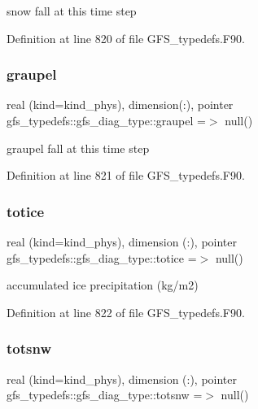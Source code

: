 snow fall at this time step 



Definition at line 820 of file G\+F\+S\+\_\+typedefs.\+F90.

\mbox{\label{structgfs__typedefs_1_1gfs__diag__type_a4667967acfa91574ee93d8a97dffd6ed}} 
\subsubsection{graupel}
{\footnotesize\ttfamily real (kind=kind\+\_\+phys), dimension(\+:), pointer gfs\+\_\+typedefs\+::gfs\+\_\+diag\+\_\+type\+::graupel =$>$ null()}



graupel fall at this time step 



Definition at line 821 of file G\+F\+S\+\_\+typedefs.\+F90.

\mbox{\label{structgfs__typedefs_1_1gfs__diag__type_ad5e6468b2005fd162123b4e9e654cbba}} 
\subsubsection{totice}
{\footnotesize\ttfamily real (kind=kind\+\_\+phys), dimension (\+:), pointer gfs\+\_\+typedefs\+::gfs\+\_\+diag\+\_\+type\+::totice =$>$ null()}



accumulated ice precipitation (kg/m2) 



Definition at line 822 of file G\+F\+S\+\_\+typedefs.\+F90.

\mbox{\label{structgfs__typedefs_1_1gfs__diag__type_a124851c1eb4aafb0ccfc27ef4c46a27a}} 
\subsubsection{totsnw}
{\footnotesize\ttfamily real (kind=kind\+\_\+phys), dimension (\+:), pointer gfs\+\_\+typedefs\+::gfs\+\_\+diag\+\_\+type\+::totsnw =$>$ null()}



